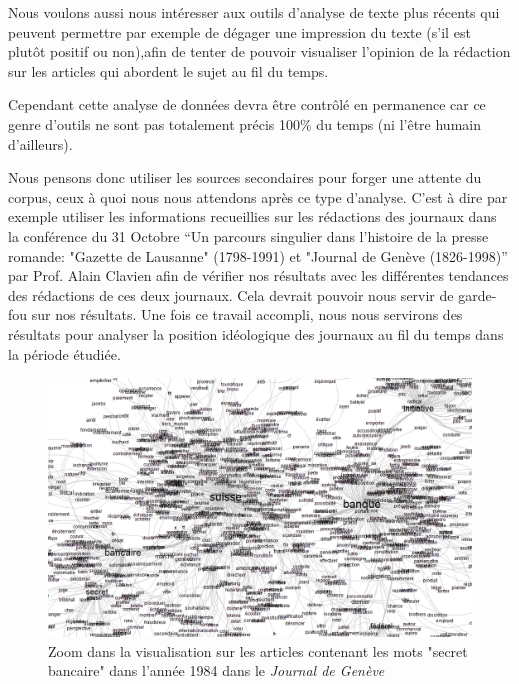 \documentclass[11pt]{article}
\begin{document}
Nous voulons aussi nous intéresser aux outils d’analyse de texte plus récents 
qui peuvent permettre par exemple de dégager une impression du texte (s’il est 
plutôt positif ou non),afin de tenter de pouvoir visualiser l’opinion de la 
rédaction sur les articles qui abordent le sujet au fil du temps.
    
Cependant cette analyse de données devra être contrôlé en permanence car ce
genre d’outils ne sont pas totalement précis 100\% du temps (ni l’être humain
d’ailleurs).
    
Nous pensons donc utiliser les sources secondaires pour forger une attente du
corpus, ceux à quoi nous nous attendons après ce type d’analyse. C’est à dire
par exemple utiliser les informations recueillies sur les rédactions des
journaux dans la conférence du 31 Octobre “Un parcours singulier dans l'histoire
de la presse romande: "Gazette de Lausanne" (1798-1991) et "Journal de Genève
(1826-1998)” par Prof. Alain Clavien afin de vérifier nos résultats avec les
différentes tendances des rédactions de ces deux journaux. Cela devrait pouvoir
nous servir de garde-fou sur nos résultats. Une fois ce travail accompli, nous
nous servirons des résultats pour analyser la position idéologique des journaux
au fil du temps dans la période étudiée. 

\begin{figure}
  \includegraphics[width=7in]{reduced.png}
  \caption{Zoom dans la visualisation sur les articles contenant les mots "secret 
bancaire" dans l'année 1984 dans le \textit{Journal de Genève}}
\end{figure}



\end{document}
